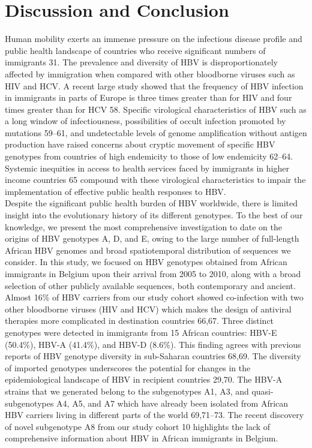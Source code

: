 \section{Discussion and Conclusion}
Human mobility exerts an immense pressure on the infectious disease profile and public health landscape of countries who receive significant numbers of immigrants 31. The prevalence and diversity of HBV is disproportionately affected by immigration when compared with other bloodborne viruses such as HIV and HCV. A recent large study showed that the frequency of HBV infection in immigrants in parts of Europe is three times greater than for HIV and four times greater than for HCV 58. Specific virological characteristics of HBV such as a long window of infectiousness, possibilities of occult infection promoted by mutations 59–61, and undetectable levels of genome amplification without antigen production have raised concerns about cryptic movement of specific HBV genotypes from countries of high endemicity to those of low endemicity 62–64. Systemic inequities in access to health services faced by immigrants in higher income countries 65 compound with these virological characteristics to impair the implementation of effective public health responses to HBV.\\

Despite the significant public health burden of HBV worldwide, there is limited insight into the evolutionary history of its different genotypes. To the best of our knowledge, we present the most comprehensive investigation to date on the origins of HBV genotypes A, D, and E, owing to the large number of full-length African HBV genomes and broad spatiotemporal distribution of sequences we consider. In this study, we focused on HBV genotypes obtained  from African immigrants in Belgium upon their arrival from 2005 to 2010, along with  a broad selection of other publicly available sequences, both contemporary and ancient. Almost 16\% of HBV carriers from our study cohort showed co-infection with two other bloodborne viruses (HIV and HCV) which makes the design of antiviral therapies more complicated in destination countries 66,67. Three distinct genotypes were detected in immigrants from 15 African countries: HBV-E (50.4\%), HBV-A (41.4\%), and HBV-D (8.6\%). This finding agrees with previous reports of HBV genotype diversity in sub-Saharan countries 68,69. The diversity of  imported genotypes underscores the potential for changes in the epidemiological landscape of HBV in recipient countries 29,70. The HBV-A strains that we generated belong to the subgenotypes A1, A3, and quasi-subgenotypes A4, A5, and A7 which have already been isolated from African HBV carriers living in different parts of the world 69,71–73. The recent discovery of novel subgenotype A8 from our study cohort 10 highlights the lack of comprehensive information about HBV in African immigrants in Belgium.\\

